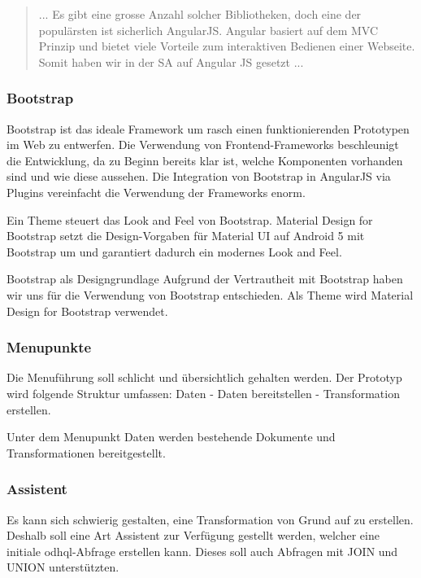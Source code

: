 \begin{quote}
... Es gibt eine grosse Anzahl solcher Bibliotheken, doch eine der populärsten ist sicherlich AngularJS. Angular basiert auf dem MVC Prinzip und bietet viele Vorteile zum interaktiven Bedienen einer Webseite. Somit haben wir in der SA auf Angular JS gesetzt ...
\cite[S. 19]{wohnortfinder}
\end{quote}

\subsubsection{Bootstrap}
Bootstrap ist das ideale Framework um rasch einen funktionierenden Prototypen im Web zu entwerfen. Die Verwendung von Frontend-Frameworks beschleunigt die Entwicklung, da zu Beginn bereits klar ist, welche Komponenten vorhanden sind und wie diese aussehen. Die Integration von Bootstrap in AngularJS via Plugins vereinfacht die Verwendung der Frameworks enorm.

Ein Theme steuert das Look and Feel von Bootstrap. Material Design for Bootstrap setzt die Design-Vorgaben für Material UI auf Android 5 mit Bootstrap um und garantiert dadurch ein modernes Look and Feel.

\begin{decision}[label=dec:frontend:bootstrap]{Bootstrap als Designgrundlage}
Aufgrund der Vertrautheit mit Bootstrap haben wir uns für die Verwendung von Bootstrap entschieden. Als Theme wird Material Design for Bootstrap verwendet.
\end{decision}

\subsubsection{Menupunkte}
Die Menuführung soll schlicht und übersichtlich gehalten werden. Der Prototyp wird folgende Struktur umfassen: Daten - Daten bereitstellen - Transformation erstellen. 

Unter dem Menupunkt Daten werden bestehende Dokumente und Transformationen bereitgestellt.

\subsubsection{Assistent}
Es kann sich schwierig gestalten, eine Transformation von Grund auf zu erstellen. Deshalb soll eine Art Assistent zur Verfügung gestellt werden, welcher eine initiale \acs{odhql}-Abfrage erstellen kann. Dieses soll auch Abfragen mit JOIN und UNION unterstützten.


